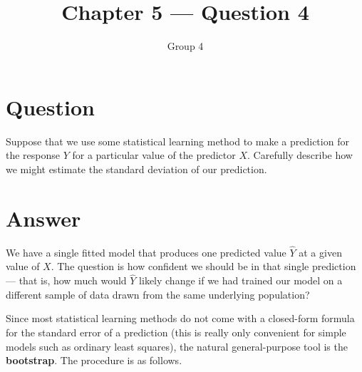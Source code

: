 \documentclass[11pt]{article}
\title{Chapter 5 --- Question 4}
\author{Group 4}
\date{}
\begin{document}
\maketitle

\section*{Question}
Suppose that we use some statistical learning method to make a prediction for the response $Y$ for a particular value of the predictor $X$. Carefully describe how we might estimate the standard deviation of our prediction.

\section*{Answer}

We have a single fitted model that produces one predicted value $\hat{Y}$ at a given value of $X$. The question is how confident we should be in that single prediction --- that is, how much would $\hat{Y}$ likely change if we had trained our model on a different sample of data drawn from the same underlying population?

Since most statistical learning methods do not come with a closed-form formula for the standard error of a prediction (this is really only convenient for simple models such as ordinary least squares), the natural general-purpose tool is the \textbf{bootstrap}. The procedure is as follows.
\end{document}
